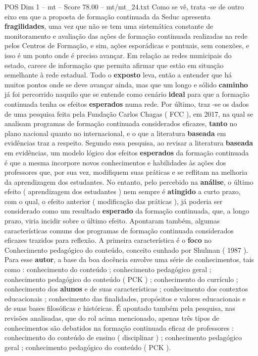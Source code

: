 \begin{textsample}{POS Dim 1 – mt – Score 78.00 – mt/mt\_24.txt}
Como se vê, trata -se de outro eixo em que a proposta de formação continuada da Seduc apresenta \textbf{fragilidades}, uma vez que não se tem uma sistemática constante de monitoramento e avaliação das ações de formação continuada realizadas na rede pelos Centros de Formação, e sim, ações esporádicas e pontuais, sem conexões, e isso é um ponto onde é preciso avançar.
Em relação as redes municipais do estado, carece de informação que permita afirmar que estão em situação semelhante à rede estadual.
Todo o \textbf{exposto} leva, então a entender que há muitos pontos onde se deve avançar ainda, mas que um longo e sólido \textbf{caminho} já foi percorrido naquilo que se entende como cenário \textbf{ideal} para que a formação continuada tenha os efeitos \textbf{esperados} numa rede.
Por último, traz -se os dados de uma pesquisa feita pela Fundação Carlos Chagas ( FCC ), em 2017, na qual se analisam programas de formação continuada considerados eficazes, \textbf{tanto} no plano nacional quanto no internacional, e o que a literatura \textbf{baseada} em evidências traz a respeito.
Segundo essa pesquisa, ao revisar a literatura \textbf{baseada} em evidências, um modelo lógico dos efeitos \textbf{esperados} da formação continuada é que a mesma incorpore novos conhecimentos e habilidades às ações dos professores que, por sua vez, modifiquem suas práticas e se reflitam na melhoria da aprendizagem dos estudantes.
No entanto, pelo percebido na \textbf{análise}, o último efeito ( aprendizagem dos estudantes ) nem sempre é \textbf{atingido} a curto prazo, com o qual, o efeito anterior ( modificação das práticas ), já poderia ser considerado como um resultado \textbf{esperado} da formação continuada, que, a longo prazo, viria incidir sobre o último efeito.
Apontaram também, algumas características comuns dos programas de formação continuada considerados eficazes trazidos para reflexão.
A primeira característica é o \textbf{foco} no Conhecimento pedagógico do conteúdo, conceito cunhado por Shulman ( 1987 ).
Para esse \textbf{autor}, a base da boa docência envolve uma série de conhecimentos, tais como : conhecimento do conteúdo ; conhecimento pedagógico geral ; conhecimento pedagógico do conteúdo ( PCK ) ; conhecimento do currículo ; conhecimento dos \textbf{alunos} e de suas características ; conhecimento dos contextos educacionais ; conhecimento das finalidades, propósitos e valores educacionais e de suas bases filosóficas e históricas.
É apontado também pela pesquisa, nas revisões analisadas, que do rol acima mencionado, apenas três tipos de conhecimentos são debatidos na formação continuada eficaz de professores : conhecimento do conteúdo de ensino ( disciplinar ) ; conhecimento pedagógico geral ; conhecimento pedagógico do conteúdo ( PCK ).

\end{textsample}
